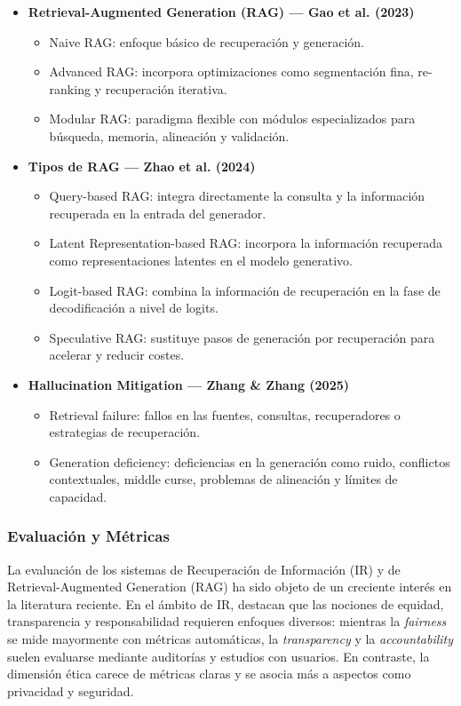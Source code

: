 \begin{itemize}
    \item \textbf{Retrieval-Augmented Generation (RAG) — Gao et al. (2023)}
    \begin{itemize}
        \item Naive RAG: enfoque básico de recuperación y generación.
        \item Advanced RAG: incorpora optimizaciones como segmentación fina, re-ranking y recuperación iterativa.
        \item Modular RAG: paradigma flexible con módulos especializados para búsqueda, memoria, alineación y validación.
    \end{itemize}

    \item \textbf{Tipos de RAG — Zhao et al. (2024)}
    \begin{itemize}
        \item Query-based RAG: integra directamente la consulta y la información recuperada en la entrada del generador.
        \item Latent Representation-based RAG: incorpora la información recuperada como representaciones latentes en el modelo generativo.
        \item Logit-based RAG: combina la información de recuperación en la fase de decodificación a nivel de logits.
        \item Speculative RAG: sustituye pasos de generación por recuperación para acelerar y reducir costes.
    \end{itemize}

    \item \textbf{Hallucination Mitigation — Zhang \& Zhang (2025)}
    \begin{itemize}
        \item Retrieval failure: fallos en las fuentes, consultas, recuperadores o estrategias de recuperación.
        \item Generation deficiency: deficiencias en la generación como ruido, conflictos contextuales, middle curse, problemas de alineación y límites de capacidad.
    \end{itemize}
\end{itemize}

\subsubsection{Evaluación y Métricas}

La evaluación de los sistemas de Recuperación de Información (IR) y de Retrieval-Augmented Generation (RAG) ha sido objeto de un creciente interés en la literatura reciente. 
En el ámbito de IR, \textcite{bernard2025fate} destacan que las nociones de equidad, transparencia y responsabilidad requieren enfoques diversos: mientras la \textit{fairness} 
se mide mayormente con métricas automáticas, la \textit{transparency} y la \textit{accountability} suelen evaluarse mediante auditorías y estudios con usuarios. En contraste, 
la dimensión ética carece de métricas claras y se asocia más a aspectos como privacidad y seguridad.  

